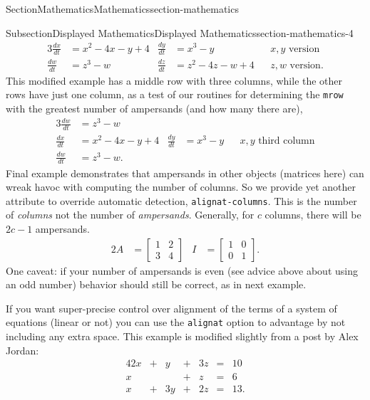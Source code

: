 \documentclass[twoside,10pt,]{article}
\newcommand{\mono}[1]{\texttt{#1}}
\numberwithin{equation}{section}
\newcommand{\amp}{&}
\begin{document}
\begin{sectionptx}{Section}{Mathematics}{}{Mathematics}{}{}{section-mathematics}
\begin{subsectionptx}{Subsection}{Displayed Mathematics}{}{Displayed Mathematics}{}{}{section-mathematics-4}
\begin{alignat*}{3}
\frac{dx}{dt} \amp = x^2 - 4x - y + 4 \amp \frac{dy}{dt} \amp = x^3 - y          \amp\amp x, y\text{ version}\\
\frac{dw}{dt} \amp = z^3 - w          \amp \frac{dz}{dt} \amp = z^2 - 4z - w + 4 \amp\amp z, w\text{ version}\text{.}
\end{alignat*}
This modified example has a middle row with three columns, while the other rows have just one column, as a test of our routines for determining the \mono{mrow} with the greatest number of ampersands (and how many there are),%
\begin{alignat*}{3}
\frac{dw}{dt} &= z^3 - w\\
\frac{dx}{dt} &= x^2 - 4x - y + 4 & \frac{dy}{dt} &= x^3 - y&& x, y\text{ third column}\\
\frac{dw}{dt} & = z^3 - w\text{.}
\end{alignat*}
Final example demonstrates that ampersands in other objects (matrices here) can wreak havoc with computing the number of columns.  So we provide yet another attribute to override automatic detection, \mono{alignat-columns}.  This is the number of \emph{columns} not the number of \emph{ampersands}.  Generally, for \(c\) columns, there will be \(2c-1\) ampersands.%
\begin{alignat*}{2}
A &= \begin{bmatrix}1 & 2 \\ 3 & 4\end{bmatrix}
&
I &= \begin{bmatrix}1 & 0 \\ 0 & 1\end{bmatrix}\text{.}
\end{alignat*}
One caveat: if your number of ampersands is even (see advice above about using an odd number) behavior should still be correct, as in next example.%
\par
If you want super-precise control over alignment of the terms of a system of equations (linear or not) you can use the \mono{alignat} option to advantage by not including any extra space.  This example is modified slightly from a post by Alex Jordan:%
\begin{alignat*}{4}
2x \amp {}+{} \amp  y \amp {}+{} \amp 3z \amp {}={} \amp 10\\
x  \amp       \amp    \amp {}+{} \amp  z \amp {}={} \amp 6\\
x  \amp {}+{} \amp 3y \amp {}+{} \amp 2z \amp {}={} \amp 13.
\end{alignat*}

\end{subsectionptx}
\end{sectionptx}
\end{document}
